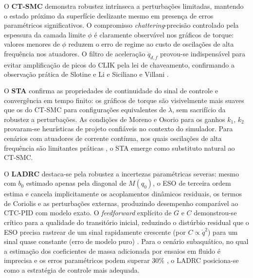 O \textbf{CT-SMC} \cite{slotine1991applied, utkin2017sliding} demonstra robustez intrínseca a perturbações limitadas, mantendo o estado próximo da superfície deslizante mesmo em presença de erros paramétricos significativos. O compromisso \textit{chattering}-precisão controlado pela espessura da camada limite $\phi$ \cite{burton1986continuous} é claramente observável nos gráficos de torque: valores menores de $\phi$ reduzem o erro de regime ao custo de oscilações de alta frequência nos atuadores. O filtro de aceleração $\ddot{q}_{d,f}$ provou-se indispensável para evitar amplificação de picos do CLIK pela lei de chaveamento, confirmando a observação prática de Slotine e Li \cite{slotine1991applied} e Siciliano e Villani \cite{siciliano1999robot}.

O \textbf{STA} \cite{levant1993sliding, moreno2012strict} confirma as propriedades de continuidade do sinal de controle e convergência em tempo finito: os gráficos de torque são visivelmente mais suaves que os do CT-SMC para configurações equivalentes de $\lambda$, sem sacrifício da robustez a perturbações. As condições de Moreno e Osorio \cite{moreno2012strict} para os ganhos $k_1$, $k_2$ provaram-se heurísticas de projeto confiáveis no contexto do simulador. Para cenários com atuadores de corrente contínua, nos quais oscilações de alta frequência são limitantes práticas \cite{shtessel2014sliding}, o STA emerge como substituto natural ao CT-SMC.

O \textbf{LADRC} \cite{gao2003scaling, han2009pid, huang2014active} destaca-se pela robustez a incertezas paramétricas severas: mesmo com $b_0$ estimado apenas pela diagonal de $M(q_0)$, o ESO de terceira ordem estima e cancela implicitamente os acoplamentos dinâmicos residuais, os termos de Coriolis e as perturbações externas, produzindo desempenho comparável ao CTC-PID com modelo exato. O \textit{feedforward} explícito de $G$ e $C$ demonstrou-se crítico para a qualidade do transitório inicial, reduzindo o distúrbio residual que o ESO precisa rastrear de um sinal rapidamente crescente (por $C \propto \dot{q}^2$) para um sinal quase constante (erro de modelo puro) \cite{han2009pid, zheng2010practical}. Para o cenário subaquático, no qual a estimação dos coeficientes de massa adicionada por ensaios em fluido é imprecisa e os erros paramétricos podem superar 30\% \cite{fossen2011handbook, aldhaheri2022underwater}, o LADRC posiciona-se como a estratégia de controle mais adequada.

